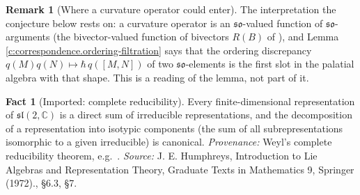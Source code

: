 \documentclass[11pt]{article}
\theoremstyle{definition}
\newtheorem{fact}[theorem]{Fact}
\newtheorem{remark}[theorem]{Remark}
\theoremstyle{plain}
\providecommand{\C}{}\renewcommand{\C}{\mathbb{C}}
\begin{document}
\begin{remark}[Where a curvature operator could enter]\label{c:note.correspondence.where-curvature-operator-could-enter}
The interpretation the conjecture below rests on: a curvature operator is an $\mathfrak{so}$-valued function of $\mathfrak{so}$-arguments (the bivector-valued function of bivectors $R(B)$ of \cite{ButlerT6}), and Lemma \ref{c:correspondence.ordering-filtration} says that the ordering discrepancy $q(M)q(N) \mapsto \hbar\,q([M,N])$ of two $\mathfrak{so}$-elements is the first slot in the palatial algebra with that shape. This is a reading of the lemma, not part of it.
\end{remark}

\begin{fact}[Imported: complete reducibility]\label{c:correspondence.imported-complete-reducibility}
Every finite-dimensional representation of $\mathfrak{sl}(2,\C)$ is a direct sum of irreducible representations, and the decomposition of a representation into isotypic components (the sum of all subrepresentations isomorphic to a given irreducible) is canonical. \emph{Provenance:} Weyl's complete reducibility theorem, e.g.\ \cite[\S6.3, \S7]{Humphreys72}.
\emph{Source:} J. E. Humphreys, Introduction to Lie Algebras and Representation Theory, Graduate Texts in Mathematics 9, Springer (1972)., \S6.3, \S7.
\end{fact}
\end{document}
